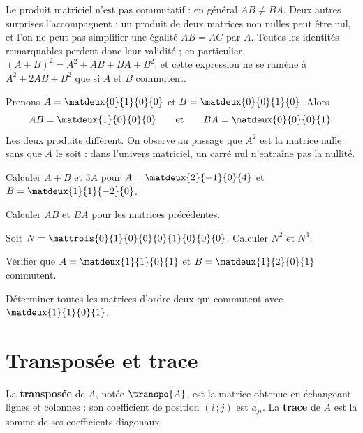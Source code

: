 \begin{avertissement}
Le produit matriciel n'est pas commutatif : en général $AB \neq BA$. Deux
autres surprises l'accompagnent : un produit de deux matrices non nulles peut
être nul, et l'on ne peut pas simplifier une égalité $AB = AC$ par $A$. Toutes
les identités remarquables perdent donc leur validité ; en particulier
$(A+B)^{2} = A^{2}+AB+BA+B^{2}$, et cette expression ne se ramène à
$A^{2}+2AB+B^{2}$ que si $A$ et $B$ commutent.
\end{avertissement}

\begin{exemple}
Prenons $A = \matdeux{0}{1}{0}{0}$ et $B = \matdeux{0}{0}{1}{0}$. Alors
\[
  AB = \matdeux{1}{0}{0}{0}
  \qquad\text{et}\qquad
  BA = \matdeux{0}{0}{0}{1}.
\]
Les deux produits diffèrent. On observe au passage que $A^{2}$ est la matrice
nulle sans que $A$ le soit : dans l'univers matriciel, un carré nul
n'entraîne pas la nullité.
\end{exemple}

\begin{entrainement}
\exo[\niveau{1}] Calculer $A+B$ et $3A$ pour
$A = \matdeux{2}{-1}{0}{4}$ et $B = \matdeux{1}{1}{-2}{0}$.

\exo[\niveau{1}] Calculer $AB$ et $BA$ pour les matrices précédentes.

\exo[\niveau{2}] Soit $N = \mattrois{0}{1}{0}{0}{0}{1}{0}{0}{0}$. Calculer
$N^{2}$ et $N^{3}$.

\exo[\niveau{2}] Vérifier que $A = \matdeux{1}{1}{0}{1}$ et
$B = \matdeux{1}{2}{0}{1}$ commutent.

\exo[\niveau{3}] Déterminer toutes les matrices d'ordre deux qui commutent
avec $\matdeux{1}{1}{0}{1}$.
\end{entrainement}

\section{Transposée et trace}

\begin{definition}
La \textbf{transposée} de $A$, notée $\transpo{A}$, est la matrice obtenue en
échangeant lignes et colonnes : son coefficient de position $(i\,;j)$ est
$a_{ji}$. La \textbf{trace} de $A$ est la somme de ses coefficients
diagonaux.
\end{definition}

